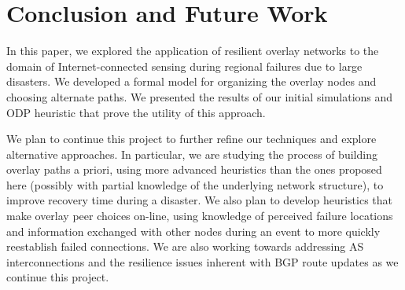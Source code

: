 \documentclass[conference]{IEEEtran}
\begin{document}
% 
% 


\section{Conclusion and Future Work}
\label{conclusion}

In this paper, we explored the application of resilient overlay networks to the domain of Internet-connected sensing during regional failures due to large disasters.
We developed a formal model for organizing the overlay nodes and choosing alternate paths.
We presented the results of our initial simulations and ODP heuristic that prove the utility of this approach.

We plan to continue this project to further refine our techniques and explore alternative approaches.
In particular, we are studying the process of building overlay paths a priori, using more advanced heuristics than the ones proposed here (possibly with partial knowledge of the underlying network structure), to improve recovery time during a disaster.
We also plan to develop heuristics that make overlay peer choices on-line, using knowledge of perceived failure locations and information exchanged with other nodes during an event to more quickly reestablish failed connections.
We are also working towards addressing AS interconnections and the resilience issues inherent with BGP route updates as we continue this project.
\end{document}
